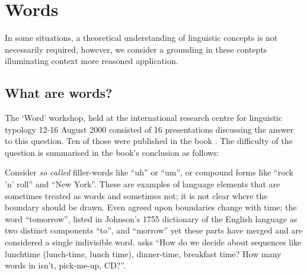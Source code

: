 \chapter{Words}\label{chap:words}
In some situations, a theoretical understanding of linguistic concepts is not necessarily required, however, we consider a grounding in these contepts illuminating context more reasoned application.

\section{What are words?}
\noindent
The `Word' workshop, held at the international research centre for linguistic typology 12-16 August 2000 consisted of 16 presentations discussing the answer to this question. Ten of those were published in the book . The difficulty of the question is summarised in the book's conclusion as follows:


Consider \emph{so called} filler-words like ``uh'' or ``um'', or compound forms like ``rock 'n' roll'' and ``New York''. These are examples of language elements that are sometimes treated as words and sometimes not; it is not clear where the boundary should be drawn. Even agreed upon boundaries change with time; the word ``tomorrow'', listed in Johnson's 1755 dictionary of the English language as two distinct components ``to'', and ``morrow'' yet these parts have merged and are considered a single indivisible word. \textcite{halliday-2004-lexicology} asks ``How do we decide about sequences like lunchtime (lunch-time, lunch time), dinner-time, breakfast time? How many words in isn't, pick-me-up, CD?''.

